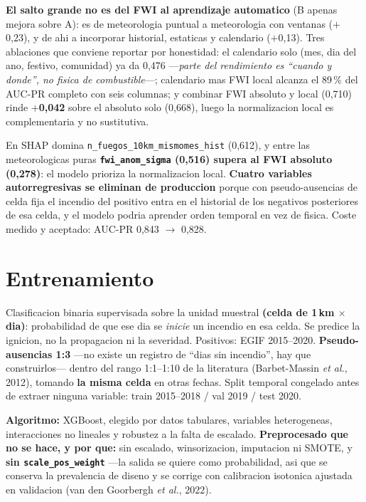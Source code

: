 \documentclass[10pt,a4paper]{article}
\newcommand{\var}[1]{\texttt{\footnotesize #1}}
\begin{document}
\textbf{El salto grande no es del FWI al aprendizaje automatico} (B apenas mejora sobre A): es de
meteorologia puntual a meteorologia con ventanas ($+$0,23), y de ahi a incorporar historial,
estaticas y calendario ($+$0,13). Tres ablaciones que conviene reportar por honestidad: el
calendario solo (mes, dia del ano, festivo, comunidad) ya da 0,476 ---\emph{parte del rendimiento
es ``cuando y donde'', no fisica de combustible}---; calendario mas FWI local alcanza el 89\,\% del
AUC-PR completo con seis columnas; y combinar FWI absoluto y local (0,710) rinde \textbf{$+$0,042}
sobre el absoluto solo (0,668), luego la normalizacion local es complementaria y no sustitutiva.

En SHAP domina \var{n\_fuegos\_10km\_mismomes\_hist} (0,612), y entre las meteorologicas puras
\textbf{\var{fwi\_anom\_sigma} (0,516) supera al FWI absoluto (0,278)}: el modelo prioriza la
normalizacion local. \textbf{Cuatro variables autorregresivas se eliminan de produccion} porque con
pseudo-ausencias de celda fija el incendio del positivo entra en el historial de los negativos
posteriores de esa celda, y el modelo podria aprender orden temporal en vez de fisica. Coste
medido y aceptado: AUC-PR 0,843 $\to$ 0,828.

\section{Entrenamiento}

Clasificacion binaria supervisada sobre la unidad muestral \textbf{(celda de 1\,km $\times$ dia)}:
probabilidad de que ese dia se \emph{inicie} un incendio en esa celda. Se predice la ignicion, no
la propagacion ni la severidad. Positivos: EGIF 2015--2020. \textbf{Pseudo-ausencias 1:3} ---no
existe un registro de ``dias sin incendio'', hay que construirlos--- dentro del rango 1:1--1:10 de
la literatura (Barbet-Massin \emph{et al.}, 2012), tomando \textbf{la misma celda} en otras fechas.
Split temporal congelado antes de extraer ninguna variable: train 2015--2018 / val 2019 /
test 2020.

\textbf{Algoritmo:} XGBoost, elegido por datos tabulares, variables heterogeneas, interacciones no
lineales y robustez a la falta de escalado. \textbf{Preprocesado que no se hace, y por que:} sin
escalado, winsorizacion, imputacion ni SMOTE, y \textbf{sin \var{scale\_pos\_weight}} ---la salida
se quiere como probabilidad, asi que se conserva la prevalencia de diseno y se corrige con
calibracion isotonica ajustada en validacion (van den Goorbergh \emph{et al.}, 2022).
\end{document}
